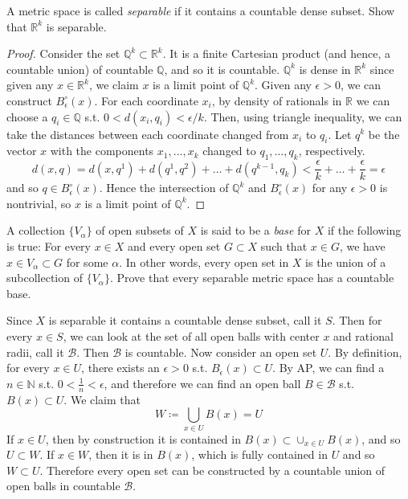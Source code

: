 \documentclass{article}
\begin{document}
    \begin{exercise}[Rudin 2.22]
    A metric space is called \textit{separable} if it contains a countable dense subset. Show that $\mathbb{R}^k$ is separable. 
    \end{exercise}
    \begin{proof}
    Consider the set $\mathbb{Q}^k \subset \mathbb{R}^k$. It is a finite Cartesian product (and hence, a countable union) of countable $\mathbb{Q}$, and so it is countable. $\mathbb{Q}^k$ is dense in $\mathbb{R}^k$ since given any $x \in \mathbb{R}^k$, we claim $x$ is a limit point of $\mathbb{Q}^k$. Given any $\epsilon > 0$, we can construct $B_\epsilon^\circ (x)$. For each coordinate $x_i$, by density of rationals in $\mathbb{R}$ we can choose a $q_i \in \mathbb{Q}$ s.t. $0 < d(x_i, q_i) < \epsilon / k$. Then, using triangle inequality, we can take the distances between each coordinate changed from $x_i$ to $q_i$. Let $q^k$ be the vector $x$ with the components $x_1, \ldots, x_k$ changed to $q_1, \ldots, q_k$, respectively. 
    \[d(x, q) = d(x, q^1) + d(q^1, q^2) + \ldots + d(q^{k-1}, q_k) < \frac{\epsilon}{k} + \ldots + \frac{\epsilon}{k} = \epsilon\]
    and so $q \in B_\epsilon^\circ (x)$. Hence the intersection of $\mathbb{Q}^k$ and $B_\epsilon^\circ (x)$ for any $\epsilon > 0$ is nontrivial, so $x$ is a limit point of $\mathbb{Q}^k$. 
    \end{proof}

    \begin{exercise}[Rudin 2.23]
    A collection $\{V_\alpha\}$ of open subsets of $X$ is said to be a \textit{base} for $X$ if the following is true: For every $x \in X$ and every open set $G \subset X$ such that $x \in G$, we have $x \in V_\alpha \subset G$ for some $\alpha$. In other words, every open set in $X$ is the union of a subcollection of $\{V_\alpha\}$. Prove that every separable metric space has a countable base. 
    \end{exercise}
    \begin{solution}
    Since $X$ is separable it contains a countable dense subset, call it $S$. Then for every $x \in S$, we can look at the set of all open balls with center $x$ and rational radii, call it $\mathcal{B}$. Then $\mathcal{B}$ is countable. Now consider an open set $U$. By definition, for every $x \in U$, there exists an $\epsilon > 0$ s.t. $B_\epsilon (x) \subset U$. By AP, we can find a $n \in \mathbb{N}$ s.t. $0 < \frac{1}{n} < \epsilon$, and therefore we can find an open ball $B \in \mathcal{B}$ s.t. $B (x) \subset U$. We claim that 
    \[W \coloneqq \bigcup_{x \in U} B (x) = U\]
    If $x \in U$, then by construction it is contained in $B(x) \subset \cup_{x \in U } B(x)$, and so $U \subset W$. If $x \in W$, then it is in $B(x)$, which is fully contained in $U$ and so $W \subset U$. Therefore every open set can be constructed by a countable union of open balls in countable $\mathcal{B}$. 
    \end{solution} 
\end{document}
